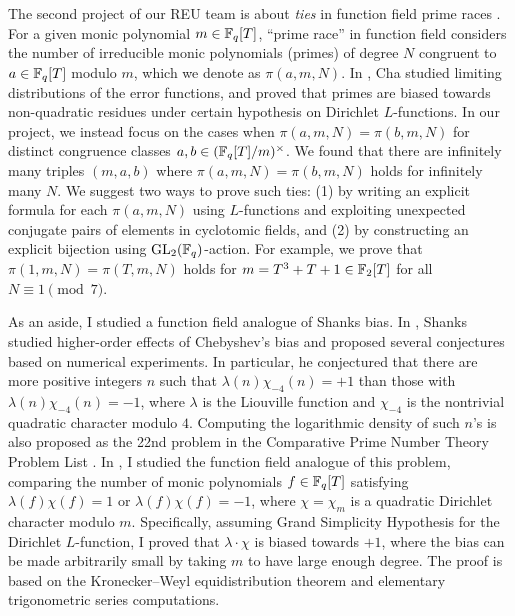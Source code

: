\documentclass[letterpaper, 10pt]{article}
\begin{document}
The second project of our REU team is about \emph{ties} in function field prime races \cite{bjlls2025tie}.
For a given monic polynomial \(m \in \mathbb{F}_q[T]\), ``prime race'' in function field considers the number of irreducible monic polynomials (primes) of degree \(N\) congruent to \(a \in \mathbb{F}_q[T]\) modulo \(m\), which we denote as \(\pi(a, m, N)\).
In \cite{cha2008chebyshev}, Cha studied limiting distributions of the error functions, and proved that primes are biased towards non-quadratic residues under certain hypothesis on Dirichlet \(L\)-functions.
In our project, we instead focus on the cases when \(\pi(a, m, N) = \pi(b, m, N)\) for distinct congruence classes \(a, b \in (\mathbb{F}_q[T] / m)^\times\).
We found that there are infinitely many triples \((m, a, b)\) where \(\pi(a, m, N) = \pi(b, m, N)\) holds for infinitely many \(N\).
We suggest two ways to prove such ties: (1) by writing an explicit formula for each \(\pi(a, m, N)\) using \(L\)-functions and exploiting unexpected conjugate pairs of elements in cyclotomic fields, and (2) by constructing an explicit bijection using \(\mathrm{GL}_2(\mathbb{F}_q)\)-action.
For example, we prove that \(\pi(1, m, N) = \pi(T, m, N)\) holds for \(m = T^3 + T + 1 \in \mathbb{F}_2[T]\) for all \(N \equiv 1 \pmod{7}\).

As an aside, I studied a function field analogue of Shanks bias.
In \cite{shanks1959quadratic}, Shanks studied higher-order effects of Chebyshev's bias and proposed several conjectures based on numerical experiments.
In particular, he conjectured that there are more positive integers \(n\) such that \(\lambda(n) \chi_{-4}(n) = +1\) than those with \(\lambda(n) \chi_{-4}(n) = -1\), where \(\lambda\) is the Liouville function and \(\chi_{-4}\) is the nontrivial quadratic character modulo \(4\).
Computing the logarithmic density of such \(n\)'s is also proposed as the 22nd problem in the Comparative Prime Number Theory Problem List \cite{hamieh2024comparative}.
In \cite{lee2025shanks}, I studied the function field analogue of this problem, comparing the number of monic polynomials \(f \in \mathbb{F}_q[T]\) satisfying \(\lambda(f) \chi(f) = 1\) or \(\lambda(f) \chi(f) = -1\), where \(\chi = \chi_m\) is a quadratic Dirichlet character modulo \(m\).
Specifically, assuming Grand Simplicity Hypothesis for the Dirichlet \(L\)-function, I proved that \(\lambda \cdot \chi\) is biased towards \(+1\), where the bias can be made arbitrarily small by taking \(m\) to have large enough degree.
The proof is based on the Kronecker--Weyl equidistribution theorem and elementary trigonometric series computations.
\end{document}
